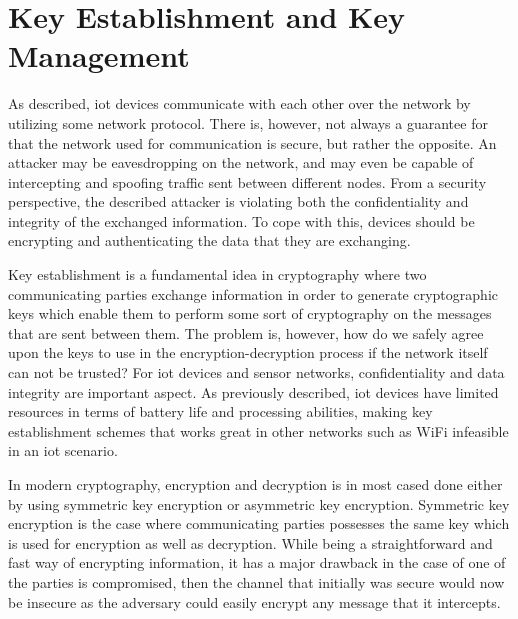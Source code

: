 

\section{Key Establishment and Key Management}

As described, \gls{iot} devices communicate with each other over the network by utilizing some network protocol. There is, however, not always a guarantee for that the network used for communication is secure, but rather the opposite. An attacker may be eavesdropping on the network, and may even be capable of intercepting and spoofing traffic sent between different nodes. From a security perspective, the described attacker is violating both the confidentiality and integrity of the exchanged information. To cope with this, devices should be encrypting and authenticating the data that they are exchanging. 



Key establishment is a fundamental idea in cryptography where two communicating parties exchange information in order to generate cryptographic keys which enable them to perform some sort of cryptography on the messages that are sent between them. The problem is, however, how do we safely agree upon the keys to use in the encryption-decryption process if the network itself can not be trusted? For \gls{iot} devices and sensor networks, confidentiality and data integrity are important aspect. As previously described, \gls{iot} devices have limited resources in terms of battery life and processing abilities, making key establishment schemes that works great in other networks such as WiFi infeasible in an \gls{iot} scenario.




In modern cryptography, encryption and decryption is in most cased done either by using symmetric key encryption or asymmetric key encryption. Symmetric key encryption is the case where communicating parties possesses the same key which is used for encryption as well as decryption. While being a straightforward and fast way of encrypting information, it has a major drawback in the case of one of the parties is compromised, then the channel that initially was secure would now be insecure as the adversary could easily encrypt any message that it intercepts.

